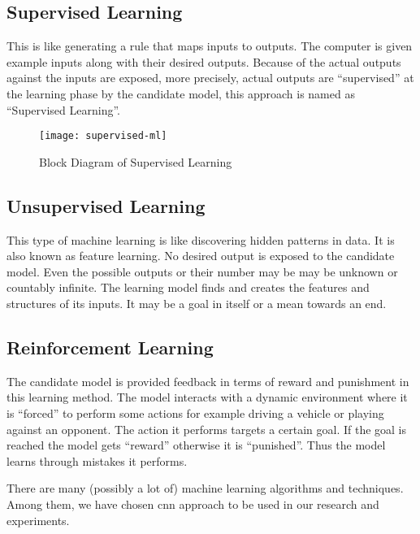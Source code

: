         \subsection{Supervised Learning}
            This is like generating a rule that maps inputs to outputs. The computer is given example inputs along with their desired outputs. Because of the actual outputs against the inputs are exposed, more precisely, actual outputs are ``supervised'' at the learning phase by the candidate model, this approach is named as ``Supervised Learning''.
        
            \begin{figure}[h]
                \centering
                \texttt{[image: supervised-ml]}
                \caption{Block Diagram of Supervised Learning}
                \label{fig:supervised_ml}
            \end{figure} 
            
            
        \subsection{Unsupervised Learning}
            This type of machine learning is like discovering hidden patterns in data. It is also known as feature learning. No desired output is exposed to the candidate model. Even the possible outputs or their number may be may be unknown or countably infinite. The learning model finds and creates the features and structures of its inputs. It may be a goal in itself or a mean towards an end.
            
        \subsection{Reinforcement Learning}
            The candidate model is provided feedback in terms of reward and punishment in this learning method. The model interacts with a dynamic environment where it is ``forced'' to perform some actions for example driving a vehicle or playing against an opponent. The action it performs targets a certain goal. If the goal is reached the model gets ``reward'' otherwise it is ``punished''. Thus the model learns through mistakes it performs.
            
            \vspace{5mm}
            There are many (possibly a lot of) machine learning algorithms and techniques. Among them, we have chosen \acrfull{cnn} approach to be used in our research and experiments.            
        
